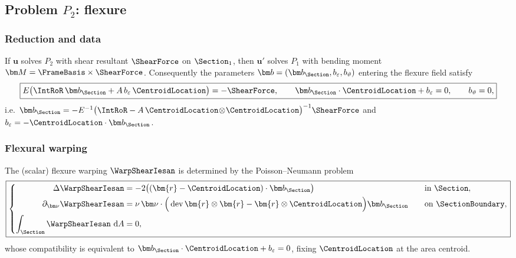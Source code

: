\subsection{Problem \(P_2\): flexure}
\subsubsection*{Reduction and data}
If \(\bm u\) solves \(P_2\) with shear resultant \(\ShearForce\) on \(\Section_1\),
then \(\bm u'\) solves \(P_1\) with bending moment \(\bm M=\FrameBasis\times\ShearForce\).
Consequently the parameters \(\bm b=(\bm b_\Section,b_\varepsilon,b_\vartheta)\) entering the flexure field satisfy
\begin{equation}
\boxed{%
E\big(\IntRoR\,\bm b_\Section+A\,b_\varepsilon\,\CentroidLocation\big)=-\ShearForce,\qquad
\bm b_\Section\cdot\CentroidLocation+b_\varepsilon=0,\qquad
b_\vartheta=0,}
\label{eq:2-18}
\end{equation}
i.e.
\(
\bm b_\Section=-E^{-1}\big(\IntRoR-A\,\CentroidLocation\!\otimes\!\CentroidLocation\big)^{-1}\ShearForce
\)
and \(b_\varepsilon=-\CentroidLocation\cdot\bm b_\Section\).

\subsubsection*{Flexural warping}
The (scalar) flexure warping \(\WarpShearIesan\) is determined by the Poisson--Neumann problem
\begin{equation}
\boxed{%
\left\{\begin{aligned}
\Delta\WarpShearIesan&=-2\big((\bm{r}-\CentroidLocation)\cdot\bm b_\Section\big)\quad &&\text{in }\Section,\\
\partial_{\bm\nu}\WarpShearIesan&=\nu\,\bm\nu\cdot\Big(\operatorname{dev}\bm{r}\otimes\bm{r}-\bm{r}\otimes\CentroidLocation\Big)\bm b_\Section
\quad &&\text{on }\SectionBoundary,\\
\int_\Section \WarpShearIesan\mathrm{~d}A&=0, &&
\end{aligned}\right.}
\label{eq:bvp-warp-shear-iesan}
\end{equation}
whose compatibility is equivalent to \(\bm b_\Section\cdot\CentroidLocation+b_\varepsilon=0\), fixing \(\CentroidLocation\) at the area centroid.

